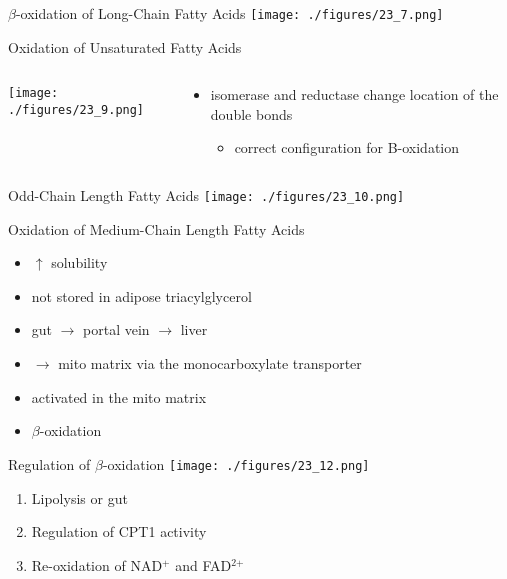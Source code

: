 \documentclass[presentation, smaller]{beamer}
\begin{document}
\begin{frame}[label={sec:orgheadline10}]{\(\beta\)-oxidation of Long-Chain Fatty Acids}
\centering
\texttt{[image: ./figures/23\_7.png]}
\end{frame}

\begin{frame}[label={sec:orgheadline11}]{Oxidation of Unsaturated Fatty Acids}
\begin{columns}
\begin{column}{0.5\columnwidth}
\centering
\texttt{[image: ./figures/23\_9.png]}
\end{column}

\begin{column}{0.5\columnwidth}
\begin{itemize}
\item isomerase and reductase change location of the double bonds
\begin{itemize}
\item correct configuration for B-oxidation
\end{itemize}
\end{itemize}
\end{column}
\end{columns}
\end{frame}
\begin{frame}[label={sec:orgheadline12}]{Odd-Chain Length Fatty Acids}
\centering
\texttt{[image: ./figures/23\_10.png]}
\end{frame}

\begin{frame}[label={sec:orgheadline13}]{Oxidation of Medium-Chain Length Fatty Acids}
\begin{itemize}
\item \(\uparrow\) solubility
\item not stored in adipose triacylglycerol
\item gut \(\to\) portal vein \(\to\) liver
\item \(\to\) mito matrix via the monocarboxylate transporter
\item activated in the mito matrix
\item \(\beta\)-oxidation
\end{itemize}
\end{frame}

\begin{frame}[label={sec:orgheadline14}]{Regulation of \(\beta\)-oxidation}
\centering
\texttt{[image: ./figures/23\_12.png]}

\begin{enumerate}
\item Lipolysis or gut
\item Regulation of CPT1 activity
\item Re-oxidation of NAD\(^{\text{+}}\) and FAD\(^{\text{2+}}\)
\end{enumerate}
\end{frame}
\end{document}
